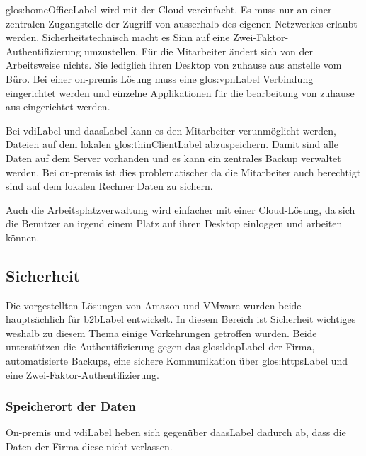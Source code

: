 \gls{glos:homeOfficeLabel} wird mit der Cloud vereinfacht. Es muss nur an einer zentralen Zugangstelle der Zugriff von ausserhalb des eigenen Netzwerkes erlaubt werden. Sicherheitstechnisch macht es Sinn auf eine Zwei-Faktor-Authentifizierung umzustellen. Für die Mitarbeiter ändert sich von der Arbeitsweise nichts. Sie lediglich ihren Desktop von zuhause aus anstelle vom Büro. Bei einer on-premis Lösung muss eine \gls{glos:vpnLabel} Verbindung eingerichtet werden und einzelne Applikationen für die bearbeitung von zuhause aus eingerichtet werden.

Bei \Gls{vdiLabel} und \Gls{daasLabel} kann es den Mitarbeiter verunmöglicht werden, Dateien auf dem lokalen \gls{glos:thinClientLabel} abzuspeichern. Damit sind alle Daten auf dem Server vorhanden und es kann ein zentrales Backup verwaltet werden. Bei on-premis ist dies problematischer da die Mitarbeiter auch berechtigt sind auf dem lokalen Rechner Daten zu sichern.

Auch die Arbeitsplatzverwaltung wird einfacher mit einer Cloud-Lösung, da sich die Benutzer an irgend einem Platz auf ihren Desktop einloggen und arbeiten können.

\subsection{Sicherheit}
Die vorgestellten Lösungen von Amazon und VMware wurden beide hauptsächlich für \Gls{b2bLabel} entwickelt. In diesem Bereich ist Sicherheit wichtiges weshalb zu diesem Thema einige Vorkehrungen getroffen wurden. Beide unterstützen die Authentifizierung gegen das \gls{glos:ldapLabel} der Firma, automatisierte Backups, eine sichere Kommunikation über \gls{glos:httpsLabel} und eine Zwei-Faktor-Authentifizierung.

\subsubsection{Speicherort der Daten}
On-premis und \Gls{vdiLabel} heben sich gegenüber \Gls{daasLabel} dadurch ab, dass die Daten der Firma diese nicht verlassen.

